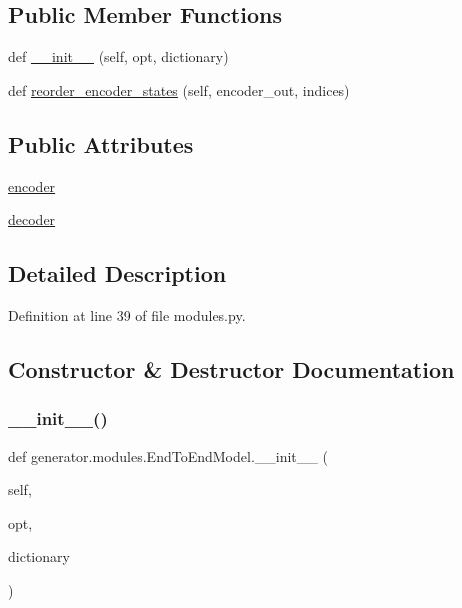 \subsection*{Public Member Functions}
\begin{DoxyCompactItemize}
\item 
def \hyperlink{classgenerator_1_1modules_1_1EndToEndModel_a4d9891e5dbe1d0d0c6665ac1ea6bb392}{\+\_\+\+\_\+init\+\_\+\+\_\+} (self, opt, dictionary)
\item 
def \hyperlink{classgenerator_1_1modules_1_1EndToEndModel_acb4d07a0296099b57c7855b0d19201f0}{reorder\+\_\+encoder\+\_\+states} (self, encoder\+\_\+out, indices)
\end{DoxyCompactItemize}
\subsection*{Public Attributes}
\begin{DoxyCompactItemize}
\item 
\hyperlink{classgenerator_1_1modules_1_1EndToEndModel_a2cff6b20a68bbe5822ced5d16177ac31}{encoder}
\item 
\hyperlink{classgenerator_1_1modules_1_1EndToEndModel_a9073a057f354a80bd27d11ba3a957155}{decoder}
\end{DoxyCompactItemize}


\subsection{Detailed Description}


Definition at line 39 of file modules.\+py.



\subsection{Constructor \& Destructor Documentation}
\mbox{\label{classgenerator_1_1modules_1_1EndToEndModel_a4d9891e5dbe1d0d0c6665ac1ea6bb392}} 
\subsubsection{\texorpdfstring{\+\_\+\+\_\+init\+\_\+\+\_\+()}{\_\_init\_\_()}}
{\footnotesize\ttfamily def generator.\+modules.\+End\+To\+End\+Model.\+\_\+\+\_\+init\+\_\+\+\_\+ (\begin{DoxyParamCaption}\item[{}]{self,  }\item[{}]{opt,  }\item[{}]{dictionary }\end{DoxyParamCaption})}



